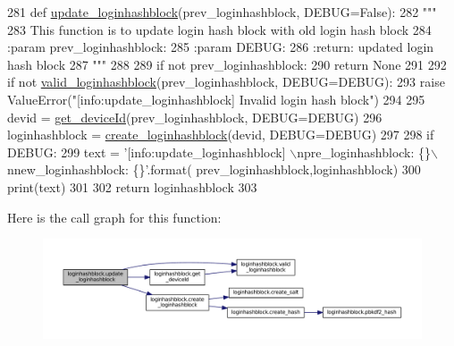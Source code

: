 \begin{DoxyCode}
281 \textcolor{keyword}{def }\hyperlink{namespaceloginhashblock_ab6bafe3dab103cc698822367e53d4a64}{update\_loginhashblock}(prev\_loginhashblock, DEBUG=False):
282     \textcolor{stringliteral}{"""}
283 \textcolor{stringliteral}{    This function is to update login hash block with old login hash block}
284 \textcolor{stringliteral}{    :param prev\_loginhashblock:}
285 \textcolor{stringliteral}{    :param DEBUG:}
286 \textcolor{stringliteral}{    :return: updated login hash block}
287 \textcolor{stringliteral}{    """}
288 
289     \textcolor{keywordflow}{if} \textcolor{keywordflow}{not} prev\_loginhashblock:
290         \textcolor{keywordflow}{return} \textcolor{keywordtype}{None}
291 
292     \textcolor{keywordflow}{if} \textcolor{keywordflow}{not} \hyperlink{namespaceloginhashblock_ac120dd8384bd51c357e2ad5f6cb2f99a}{valid\_loginhashblock}(prev\_loginhashblock, DEBUG=DEBUG):
293         \textcolor{keywordflow}{raise} ValueError(\textcolor{stringliteral}{"[info:update\_loginhashblock] Invalid login hash block"})
294 
295     devid = \hyperlink{namespaceloginhashblock_a1908d7c90a7ea1a7f84eeac3a1378b57}{get\_deviceId}(prev\_loginhashblock, DEBUG=DEBUG)
296     loginhashblock = \hyperlink{namespaceloginhashblock_ad3ef8dab740c69ca8424797f9c146a53}{create\_loginhashblock}(devid, DEBUG=DEBUG)
297 
298     \textcolor{keywordflow}{if} DEBUG:
299         text = \textcolor{stringliteral}{'[info:update\_loginhashblock] \(\backslash\)npre\_loginhashblock: \{\}\(\backslash\)nnew\_loginhashblock: \{\}'}.format(
      prev\_loginhashblock,loginhashblock)
300         print(text)
301 
302     \textcolor{keywordflow}{return} loginhashblock
303 
\end{DoxyCode}


Here is the call graph for this function\+:\nopagebreak
\begin{figure}[H]
\begin{center}
\leavevmode
\includegraphics[width=350pt]{namespaceloginhashblock_ab6bafe3dab103cc698822367e53d4a64_cgraph}
\end{center}
\end{figure}




